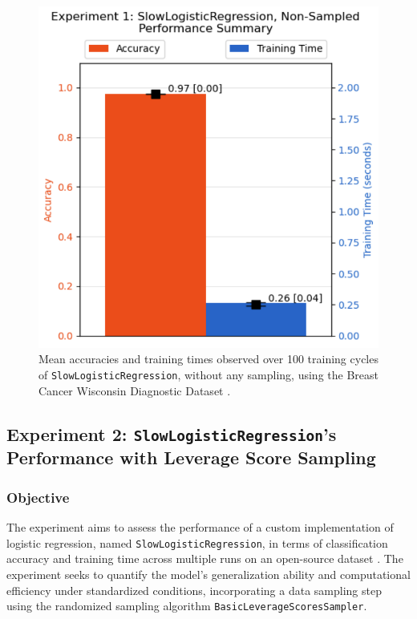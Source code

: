 \documentclass{article}
\theoremstyle{plain}
\theoremstyle{definition}
\theoremstyle{remark}
\begin{document}
\begin{figure}[ht]
	\vskip 0.2in
	\begin{center}
		\centerline{\includegraphics[width=\columnwidth]{experiment_01}}
		\caption{Mean accuracies and training times observed over 100 training cycles of \texttt{SlowLogisticRegression}, without any sampling, using the Breast Cancer Wisconsin Diagnostic Dataset \cite{breastcancer}.}
		\label{experiment_01}
	\end{center}
	\vskip -0.2in
\end{figure}


\subsection{Experiment 2: \texttt{SlowLogisticRegression}'s Performance with Leverage Score Sampling}

\subsubsection{Objective}

The experiment aims to assess the performance of a custom implementation of logistic regression, named \texttt{SlowLogisticRegression}, in terms of classification accuracy and training time across multiple runs on an open-source dataset \cite{breastcancer}. The experiment seeks to quantify the model's generalization ability and computational efficiency under standardized conditions, incorporating a data sampling step using the randomized sampling algorithm \texttt{BasicLeverageScoresSampler}.
\end{document}

